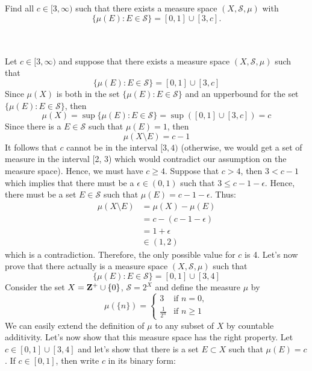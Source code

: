 \begin{exercise}
    Find all $c \in [3, \infty)$ such that there exists a measure space $(X, \mathcal{S}, \mu)$ with
    $$\{\mu(E) : E\in\mathcal{S}\} = [0,1] \cup [3, c].$$ \\
\end{exercise}

\begin{solution}
    \\ Let $c \in [3, \infty)$ and suppose that there exists a measure space $(X, \mathcal{S}, \mu)$ such that 
    $$\{\mu(E) : E\in\mathcal{S}\} = [0,1] \cup [3, c]$$
    Since $\mu(X)$ is both in the set $\{\mu(E) : E\in\mathcal{S}\}$ and an upperbound for the set $\{\mu(E) : E\in\mathcal{S}\}$, then 
    $$\mu(X) = \sup \{\mu(E) : E\in\mathcal{S}\} = \sup ([0,1] \cup [3, c]) = c$$
    Since there is a $E \in \mathcal{S}$ such that $\mu(E) = 1$, then
    $$\mu(X \setminus E) = c - 1$$
    It follows that $c$ cannot be in the interval $[3, 4)$ (otherwise, we would get a set of measure in the interval [2, 3) which would contradict our assumption on the measure space). Hence, we must have $c \geq 4$. Suppose that $c > 4$, then $3 < c-1$ which implies that there must be a $\epsilon \in (0, 1)$ such that $3 \leq c - 1 - \epsilon$. Hence, there must be a set $E \in \mathcal{S}$ such that $\mu(E) = c - 1 - \epsilon$. Thus:
    \begin{align*}
        \mu(X \setminus E) &= \mu(X) - \mu(E) \\
        &= c - (c - 1 - \epsilon) \\
        &= 1 + \epsilon \\
        &\in (1, 2)
    \end{align*}
    which is a contradiction. Therefore, the only possible value for $c$ is 4. Let's now prove that there actually is a measure space $(X, \mathcal{S}, \mu)$ such that 
    $$\{\mu(E) : E\in\mathcal{S}\} = [0,1] \cup [3, 4]$$
    Consider the set $X = \mathbf{Z}^+ \cup \{0\}$, $\mathcal{S} = 2^X$ and define the measure $\mu$ by
    $$\mu(\{n\}) = \begin{cases}
        3 & \text{if } n = 0, \\
        \frac{1}{2^n} & \text{if }n \geq 1
    \end{cases}$$
    We can easily extend the definition of $\mu$ to any subset of $X$ by countable additivity. Let's now show that this measure space has the right property. Let $c \in [0,1] \cup [3, 4]$ and let's show that there is a set $E \subset X$ such that $\mu(E) = c$. If $c \in [0,1]$, then write $c$ in its binary form:

\end{solution}
